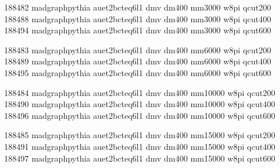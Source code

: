 188482 madgraphpythia auet2bcteq6l1 dmv dm400 mm3000 w8pi qcut200\\
188488 madgraphpythia auet2bcteq6l1 dmv dm400 mm3000 w8pi qcut400\\
188494 madgraphpythia auet2bcteq6l1 dmv dm400 mm3000 w8pi qcut600

188483 madgraphpythia auet2bcteq6l1 dmv dm400 mm6000 w8pi qcut200\\
188489 madgraphpythia auet2bcteq6l1 dmv dm400 mm6000 w8pi qcut400\\
188495 madgraphpythia auet2bcteq6l1 dmv dm400 mm6000 w8pi qcut600

188484 madgraphpythia auet2bcteq6l1 dmv dm400 mm10000 w8pi qcut200\\
188490 madgraphpythia auet2bcteq6l1 dmv dm400 mm10000 w8pi qcut400\\
188496 madgraphpythia auet2bcteq6l1 dmv dm400 mm10000 w8pi qcut600

188485 madgraphpythia auet2bcteq6l1 dmv dm400 mm15000 w8pi qcut200\\
188491 madgraphpythia auet2bcteq6l1 dmv dm400 mm15000 w8pi qcut400\\
188497 madgraphpythia auet2bcteq6l1 dmv dm400 mm15000 w8pi qcut600